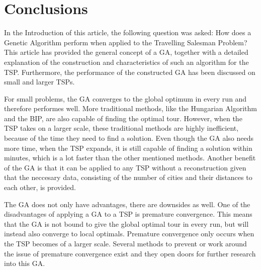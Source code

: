 \section{Conclusions}
\par
In the Introduction of this article, the following question was asked: How does a Genetic Algorithm perform when applied to the Travelling Salesman Problem?
This article has provided the general concept of a GA, together with a detailed explanation of the construction and characteristics of such an algorithm for the TSP. Furthermore, the performance of the constructed GA has been discussed on small and larger TSPs. 

\par
For small problems, the GA converges to the global optimum in every run and therefore performes well. More traditional methods, like the Hungarian Algorithm and the BIP, are also capable of finding the optimal tour. However, when the TSP takes on a larger scale, these traditional methods are highly inefficient, because of the time they need to find a solution. Even though the GA also needs more time, when the TSP expands, it is still capable of finding a solution within minutes, which is a lot faster than the other mentioned methods. Another benefit of the GA is that it can be applied to any TSP without a reconstruction given that the neccesary data, consisting of the number of cities and their distances to each other, is provided. 

\par
The GA does not only have advantages, there are downsides as well. One of the disadvantages of applying a GA to a TSP is premature convergence. This means that the GA is not bound to give the global optimal tour in every run, but will instead also converge to local optimals. Premature convergence only occurs when the TSP becomes of a larger scale. Several methods to prevent or work around the issue of premature convergence exist \cite{Premconvergence} and they open doors for further research into this GA. 
